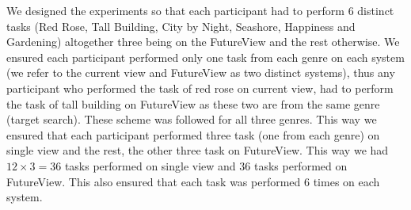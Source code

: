 \documentclass[english]{tktltiki}
\begin{document}
We designed the experiments so that each participant had to perform 6 distinct tasks (Red Rose, Tall Building, City by Night, Seashore, Happiness and Gardening) altogether three being on the FutureView and the rest otherwise. We ensured each participant performed only one task from each genre on each system (we refer to the current view and FutureView as two distinct systems), thus any participant who performed the task of red rose on current view, had to perform the task of tall building on FutureView as these two are from the same genre (target search). These scheme was followed for all three genres. This way we ensured that each participant performed three task (one from each genre) on single view and the rest, the other three task on FutureView. This way we had $12 \times 3 = 36$ tasks performed on single view and $36$ tasks performed on FutureView. This also ensured that each task was performed $6$ times on each system.
\end{document}
